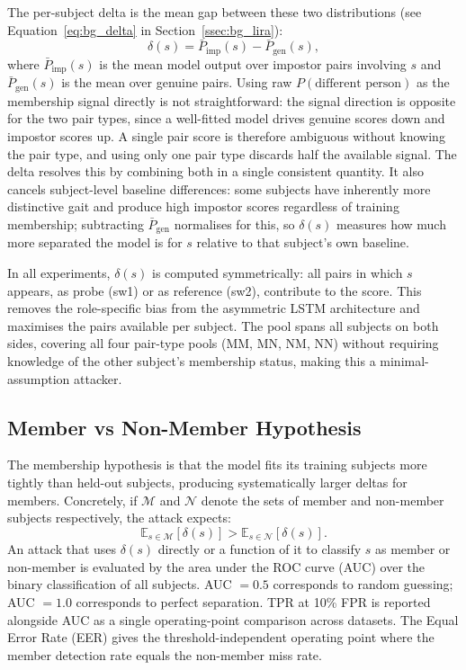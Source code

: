 The per-subject delta is the mean gap between these two distributions (see Equation~\eqref{eq:bg_delta} in Section~\ref{ssec:bg_lira}):
\begin{equation*}
  \delta(s) = \bar{P}_{\text{imp}}(s) - \bar{P}_{\text{gen}}(s),
\end{equation*}
where $\bar{P}_{\text{imp}}(s)$ is the mean model output over impostor pairs involving $s$ and $\bar{P}_{\text{gen}}(s)$ is the mean over genuine pairs. Using raw $P(\text{different person})$ as the membership signal directly is not straightforward: the signal direction is opposite for the two pair types, since a well-fitted model drives genuine scores down and impostor scores up. A single pair score is therefore ambiguous without knowing the pair type, and using only one pair type discards half the available signal. The delta resolves this by combining both in a single consistent quantity. It also cancels subject-level baseline differences: some subjects have inherently more distinctive gait and produce high impostor scores regardless of training membership; subtracting $\bar{P}_{\text{gen}}$ normalises for this, so $\delta(s)$ measures how much more separated the model is for $s$ relative to that subject's own baseline.

In all experiments, $\delta(s)$ is computed symmetrically: all pairs in which $s$ appears, as probe (sw1) or as reference (sw2), contribute to the score. This removes the role-specific bias from the asymmetric LSTM architecture and maximises the pairs available per subject. The pool spans all subjects on both sides, covering all four pair-type pools (MM, MN, NM, NN) without requiring knowledge of the other subject's membership status, making this a minimal-assumption attacker.

\subsection{Member vs Non-Member Hypothesis}
\label{ssec:mia_hypothesis}

The membership hypothesis is that the model fits its training subjects more tightly than held-out subjects, producing systematically larger deltas for members. Concretely, if $\mathcal{M}$ and $\mathcal{N}$ denote the sets of member and non-member subjects respectively, the attack expects:
\begin{equation}
  \mathbb{E}_{s \in \mathcal{M}}[\delta(s)]
  > \mathbb{E}_{s \in \mathcal{N}}[\delta(s)].
\end{equation}
An attack that uses $\delta(s)$ directly or a function of it to classify $s$ as member or non-member is evaluated by the area under the ROC curve (AUC) over the binary classification of all subjects. AUC $= 0.5$ corresponds to random guessing; AUC $= 1.0$ corresponds to perfect separation. TPR at 10\% FPR is reported alongside AUC as a single operating-point comparison across datasets. The Equal Error Rate (EER) gives the threshold-independent operating point where the member detection rate equals the non-member miss rate.

